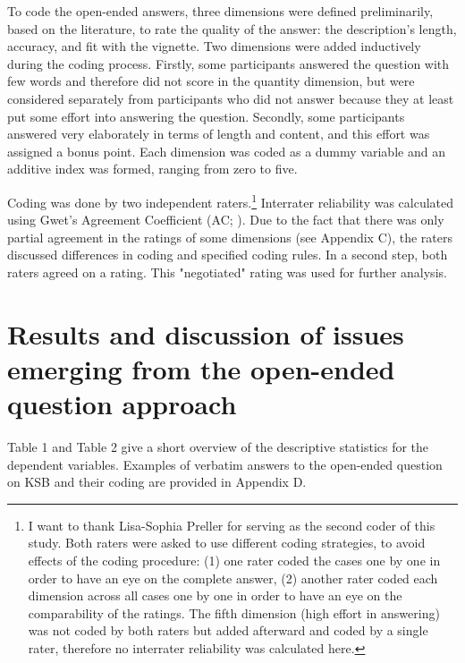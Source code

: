 \documentclass[twocolumn, serif, empirical, authordate]{jote-article}
\begin{document}
To code the open-ended answers, three dimensions were defined preliminarily, based on the literature, to rate the quality of the answer: the description's length, accuracy, and fit with the vignette.
Two dimensions were added inductively during the coding process.
Firstly, some participants answered the question with few words and therefore did not score in the quantity dimension, but were considered separately from participants who did not answer because they at least put some effort into answering the question. Secondly, some participants answered very elaborately in terms of length and content, and this effort was assigned a bonus point. Each dimension was coded as a dummy variable and an additive index was formed, ranging from zero to five.

Coding was done by two independent raters.\footnote{I want to thank Lisa-Sophia Preller for serving as the second coder of this study.
 Both raters were asked to use different coding strategies, to avoid effects of the coding procedure: (1) one rater coded the cases one by one in order to have an eye on the complete answer, (2) another rater coded each dimension across all cases one by one in order to have an eye on the comparability of the ratings. The fifth dimension (high effort in answering) was not coded by both raters but added afterward and coded by a single rater, therefore no interrater reliability was calculated here.} Interrater reliability was calculated using Gwet's Agreement Coefficient (AC; ). Due to the fact that there was only partial agreement in the ratings of some dimensions (see Appendix C), the raters discussed differences in coding and specified coding rules. In a second step, both raters agreed on a rating. This "negotiated" rating was used for further analysis.


\section*{Results and discussion of issues emerging from the open-ended question approach}

Table 1 and Table 2 give a short overview of the descriptive statistics for the dependent variables. Examples of verbatim answers to the open-ended question on KSB and their coding are provided in Appendix D.
\end{document}
